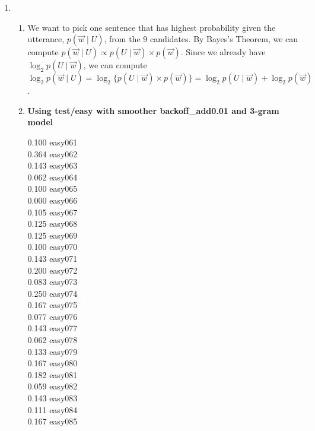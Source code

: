\documentclass[10pt]{article}
\begin{document}
\begin{enumerate}
    \item %
        \begin{enumerate}
            \item %
                We want to pick one sentence that has highest probability given the utterance, $p(\vec{w} \mid U)$, from the 9 candidates. By Bayes's Theorem, we can compute $p(\vec{w} \mid U) \propto p(U \mid \vec{w}) \times p(\vec{w})$. Since we already have $\log_2 p(U \mid \vec{w})$, we can compute $\log_2p(\vec{w} \mid U) = \log_2 \{p(U \mid \vec{w}) \times p(\vec{w})\} = \log_2 p(U \mid \vec{w}) + \log_2 p(\vec{w})$.\\
            \addtocounter{enumii}{1}
            \item %
            \textbf{Using test/easy with smoother backoff\_add0.01 and 3-gram model}
            \begin{multicols}{5}
            0.100 easy061\\
            0.364 easy062\\
            0.143 easy063\\
            0.062 easy064\\
            0.100 easy065\\
            0.000 easy066\\
            0.105 easy067\\
            0.125 easy068\\
            0.125 easy069\\
            0.100 easy070\\
            0.143 easy071\\
            0.200 easy072\\
            0.083 easy073\\
            0.250 easy074\\
            0.167 easy075\\
            0.077 easy076\\
            0.143 easy077\\
            0.062 easy078\\
            0.133 easy079\\
            0.167 easy080\\
            0.182 easy081\\
            0.059 easy082\\
            0.143 easy083\\
            0.111 easy084\\
            0.167 easy085\\

\end{multicols}
\end{enumerate}
\end{enumerate}
\end{document}
